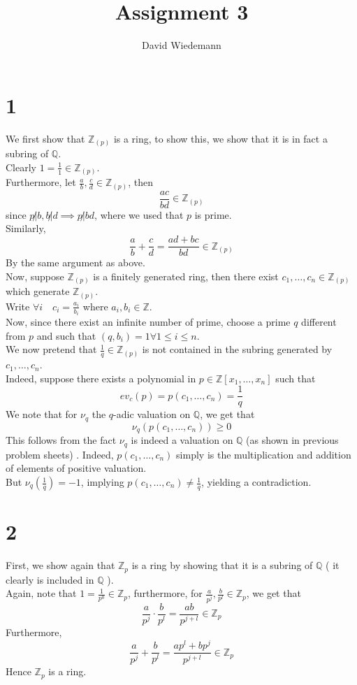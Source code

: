 \documentclass[11pt, a4paper]{article}
\begin{document}
\title{Assignment 3}
\author{David Wiedemann}
\maketitle
\section*{1}
We first show that $ \mathbb{Z}_{ ( p) } $ is a ring, to show this, we show that it is in fact a subring of $ \mathbb{Q}$.\\
Clearly $ 1 = \frac{1}{1}\in \mathbb{Z}_{ ( p) } $.\\
Furthermore, let $ \frac{a}{b}, \frac{c}{d}\in \mathbb{Z}_{ ( p) } $, then
\[ 
\frac{ac}{bd} \in \mathbb{Z}_{ ( p) } 
\]
since $ p\not|b , b\not| d \implies p \not | bd$, where we used that $p$ is prime.\\
Similarly, 
\[ 
\frac{a}{b} + \frac{c}{d} = \frac{ ad + bc}{bd} \in \mathbb{Z}_{ ( p) } 
\]
By the same argument as above.\\

Now, suppose $\mathbb{Z}_{ ( p) } $ is a finitely generated ring, then there exist $ c_1,\ldots,c_n\in \mathbb{Z}_{ ( p) } $ which generate $ \mathbb{Z}_{ ( p) } $.\\
Write $ \forall i \quad c_i = \frac{a_i}{b_i}$ where $a_i, b_i\in \mathbb{Z}$.\\
Now, since there exist an infinite number of prime, choose a prime $q$ different from $p$ and such that $ ( q, b_i) = 1\forall 1 \leq i \leq n$.\\
We now pretend that $ \frac{1}{q}\in \mathbb{Z}_{ ( p) } $ is not contained in the subring generated by $ c_1,\ldots, c_n$.\\
Indeed, suppose there exists a polynomial in $ p\in \mathbb{Z}[x_1,\ldots,x_n]$ such that 
\[ 
ev_c( p) = p( c_1,\ldots,c_n) = \frac{1}{q}
\]
We note that for $ \nu_q$ the $q$-adic valuation on $ \mathbb{Q}$, we get that
\[ 
\nu_q(p ( c_1,\ldots,c_n))    \geq 0
\]
This follows from the fact $\nu_q$ is indeed a valuation on $\mathbb{Q}$ (as shown in previous problem sheets) . Indeed, $p( c_1, \ldots,c_n) $ simply is the multiplication and addition of elements of positive valuation.  \\
But $\nu_q( \frac{1}{q}) = -1$, implying $ p( c_1,\ldots,c_n) \neq \frac{1}{q}$, yielding a contradiction.
\section*{2}
First, we show again that $ \mathbb{Z}_p$ is a ring by showing that it is a subring of $ \mathbb{Q}$ ( it clearly is included in $ \mathbb{Q}$ ).\\
Again, note that $ 1= \frac{1}{p^{0}}\in \mathbb{Z}_p$, furthermore, for $ \frac{a}{p^{j}}, \frac{b}{p^{l}}\in \mathbb{Z}_p$, we get that
\[ 
\frac{a}{p^{j}}\cdot \frac{b}{p^{l}} = \frac{ab}{p^{j+l}} \in \mathbb{Z}_p
\]
Furthermore,
\[ 
\frac{a}{p^{j}} + \frac{b}{p^{l}} = \frac{ap^{l}+ bp^{j}}{p^{j+l}}\in \mathbb{Z}_p
\]
Hence $ \mathbb{Z}_p$ is a ring.\\
\end{document}
